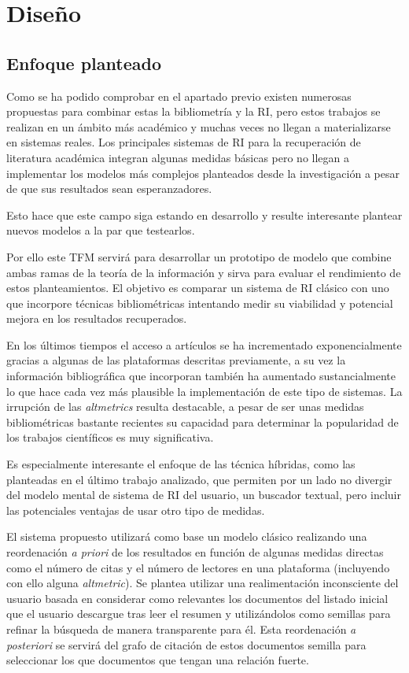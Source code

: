 \chapter{Diseño}

\section{Enfoque planteado}
Como se ha podido comprobar en el apartado previo existen numerosas propuestas para combinar estas la bibliometría y la \acrshort{RI}, pero estos trabajos se realizan en un ámbito más académico y muchas veces no llegan a materializarse en sistemas reales. Los principales sistemas de \acrshort{RI} para la recuperación de literatura académica integran algunas medidas básicas pero no llegan a implementar los modelos más complejos planteados desde la investigación a pesar de que sus resultados sean esperanzadores. 

Esto hace que este campo siga estando en desarrollo y resulte interesante plantear nuevos modelos a la par que testearlos.

Por ello este \acrshort{TFM} servirá para desarrollar un prototipo de modelo que combine ambas ramas de la teoría de la información y sirva para evaluar el rendimiento de estos planteamientos. El objetivo es comparar un sistema de \acrshort{RI} clásico con uno que incorpore técnicas bibliométricas intentando medir su viabilidad y potencial mejora en los resultados recuperados.

En los últimos tiempos el acceso a artículos se ha incrementado exponencialmente gracias a algunas de las plataformas descritas previamente, a su vez la información bibliográfica que incorporan también ha aumentado sustancialmente lo que hace cada vez más plausible la implementación de este tipo de sistemas. La irrupción de las \textit{altmetrics} resulta destacable, a pesar de ser unas medidas bibliométricas bastante recientes su capacidad para determinar la popularidad de los trabajos científicos es muy significativa.

Es especialmente interesante el enfoque de las técnica híbridas, como las planteadas en el último trabajo analizado, que permiten por un lado no divergir del modelo mental de sistema de \acrshort{RI} del usuario, un buscador textual, pero incluir las potenciales ventajas de usar otro tipo de medidas. 

El sistema propuesto utilizará como base un modelo clásico realizando una reordenación \textit{a priori} de los resultados en función de algunas medidas directas como el número de citas y el número de lectores en una plataforma (incluyendo con ello alguna \textit{altmetric}). Se plantea utilizar una realimentación inconsciente del usuario basada en considerar como relevantes los documentos del listado inicial que el usuario descargue tras leer el resumen y utilizándolos como semillas para refinar la búsqueda de manera transparente para él. Esta reordenación  \textit{a posteriori} se servirá del grafo de citación de estos documentos semilla para seleccionar los que documentos que tengan una relación fuerte.

